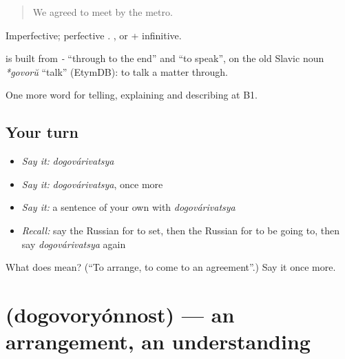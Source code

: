 \begin{quote}
We agreed to meet by the metro.
\end{quote}

Imperfective; perfective \emph{}. \emph{    }, or + infinitive.

\begin{cousinweb}
\textbf{} is built from \emph{-} \textquotedblleft{}through to the end\textquotedblright{} and \emph{} \textquotedblleft{}to speak\textquotedblright{}, on the old Slavic noun \emph{*govorŭ} \textquotedblleft{}talk\textquotedblright{} (EtymDB): to talk a matter through.
\end{cousinweb}

\begin{grammarlens}[title={What you've built}]
One more word for telling, explaining and describing at B1.
\end{grammarlens}

\subsection*{Your turn}
\begin{itemize}
\raggedright
  \item \emph{Say it:} \emph{dogovárivatsya}
  \item \emph{Say it:} \emph{dogovárivatsya}, once more
  \item \emph{Say it:} a sentence of your own with \emph{dogovárivatsya}
  \item \emph{Recall:} say the Russian for to set, then the Russian for to be going to, then say \emph{dogovárivatsya} again
\end{itemize}

\begin{tcolorbox}[breakable,colback=teal!4,colframe=teal!35!black,title={Before you move on}]
What does  mean? (\textquotedblleft{}To arrange, to come to an agreement\textquotedblright{}.) Say it once more.
\end{tcolorbox}
\section[\texorpdfstring{\ru{договорённость} (dogovoryónnost)}{договорённость (dogovoryónnost)}]{ (dogovoryónnost) — an arrangement, an understanding}

\label{lesson:RU-C378-dogovoryonnost}



